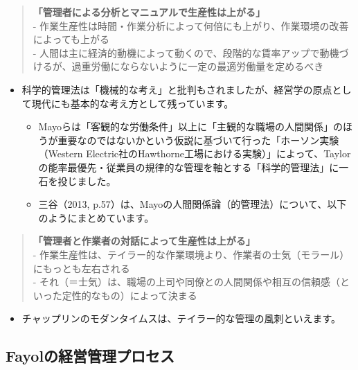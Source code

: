 \documentclass[
]{book}
\providecommand{\tightlist}{%
  \setlength{\itemsep}{0pt}\setlength{\parskip}{0pt}}
\begin{document}
\begin{quote}
\textbf{「管理者による分析とマニュアルで生産性は上がる」}\\
- 作業生産性は時間・作業分析によって何倍にも上がり、作業環境の改善によっても上がる\\
- 人間は主に経済的動機によって動くので、段階的な賃率アップで動機づけるが、過重労働にならないように一定の最適労働量を定めるべき
\end{quote}

\begin{itemize}
\item
  科学的管理法は「機械的な考え」と批判もされましたが、経営学の原点として現代にも基本的な考え方として残っています。

  \begin{itemize}
  \item
    Mayoらは「客観的な労働条件」以上に「主観的な職場の人間関係」のほうが重要なのではないかという仮説に基づいて行った「ホーソン実験（Western Electric社のHawthorne工場における実験）」によって、Taylorの能率最優先・従業員の規律的な管理を軸とする「科学的管理法」に一石を投じました。
  \item
    三谷（2013, p.57）は、Mayoの人間関係論（的管理法）について、以下のようにまとめています。
  \end{itemize}
\end{itemize}

\begin{quote}
\textbf{「管理者と作業者の対話によって生産性は上がる」}\\
- 作業生産性は、テイラー的な作業環境より、作業者の士気（モラール）にもっとも左右される\\
- それ（＝士気）は、職場の上司や同僚との人間関係や相互の信頼感（といった定性的なもの）によって決まる
\end{quote}

\begin{itemize}
\tightlist
\item
  チャップリンのモダンタイムスは、テイラー的な管理の風刺といえます。
\end{itemize}

\hypertarget{fayol}{%
\subsection{Fayolの経営管理プロセス}\label{fayol}}
\end{document}
